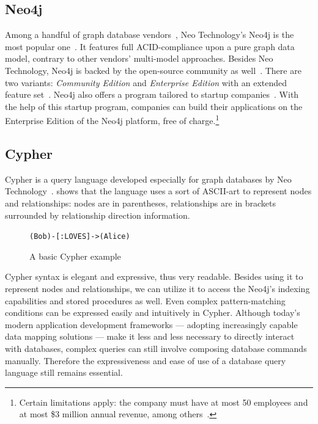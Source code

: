 \subsection{Neo4j}
\label{subsection:preliminaryneo4j}

Among a handful of graph database vendors~\cite{graph-dbs}, Neo Technology's Neo4j is the most popular one~\cite{graph-dbs-raking}. It features full ACID-compliance upon a pure graph data model, contrary to other vendors' multi-model approaches. Besides Neo Technology, Neo4j is backed by the open-source community as well~\cite{neo4j-github}. There are two variants: \emph{Community Edition} and \emph{Enterprise Edition} with an extended feature set~\cite{neo4j-licensing}. Neo4j also offers a program tailored to startup companies~\cite{neo4j-startup-program}. With the help of this startup program, companies can build their applications on the Enterprise Edition of the Neo4j platform, free of charge.\footnote{Certain limitations apply: the company must have at most 50 employees and at most \$3 million annual revenue, among others~\cite{neo4j-startup-program}.}

\subsection{Cypher}

Cypher is a query language developed especially for graph databases by Neo Technology~\cite{neo4j-cypher}.  shows that the language uses a sort of ASCII-art to represent nodes and relationships: nodes are in parentheses, relationships are in brackets surrounded by relationship direction information.

\begin{figure}[!htb]
    \centering
    \lstinline{(Bob)-[:LOVES]->(Alice)}
    \caption{A basic Cypher example}
    \label{fig:cypher-intro}
\end{figure}

Cypher syntax is elegant and expressive, thus very readable. Besides using it to represent nodes and relationships, we can utilize it to access the Neo4j's indexing capabilities and stored procedures as well. Even complex pattern-matching conditions can be expressed easily and intuitively in Cypher. Although today's modern application development frameworks — adopting increasingly capable data mapping solutions — make it less and less necessary to directly interact with databases, complex queries can still involve composing database commands manually. Therefore the expressiveness and ease of use of a database query language still remains essential.

